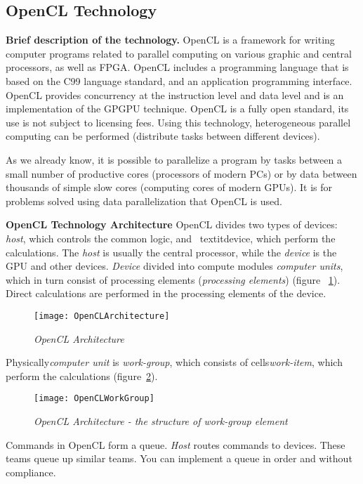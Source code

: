{ %
	\subsection{OpenCL Technology}
	\label{OpenCL:section}
	\par\textbf{Brief description of the technology.} OpenCL is a framework for writing computer programs related to parallel computing on various graphic and central processors, as well as FPGA. OpenCL includes a programming language that is based on the C99 language standard, and an application programming interface. OpenCL provides concurrency at the instruction level and data level and is an implementation of the GPGPU technique. OpenCL is a fully open standard, its use is not subject to licensing fees. Using this technology, heterogeneous parallel computing can be performed (distribute tasks between different devices).
	\par As we already know, it is possible to parallelize a program by tasks between a small number of productive cores (processors of modern PCs) or by data between thousands of simple slow cores (computing cores of modern GPUs). It is for problems solved using data parallelization that OpenCL is used.
	\par\textbf{OpenCL Technology Architecture} OpenCL divides two types of devices: \textit{host}, which controls the common logic, and \ textit{device}, which perform the calculations. The \textit{host} is usually the central processor, while the \textit{device} is the GPU and other devices. \textit{Device} divided into compute modules \textit{computer units}, which in turn consist of processing elements (\textit{processing elements}) (figure ~\ref{OpenCLArchitecture:image}). Direct calculations are performed in the processing elements of the device.
	\begin{figure}[H]
		\texttt{[image: OpenCLArchitecture]}
		\caption{\textit{OpenCL Architecture}}
		\label{OpenCLArchitecture:image}
	\end{figure}
	\par Physically\textit{computer unit} is \textit{work-group}, which consists of cells\textit{work-item}, which perform the calculations (figure~\ref{OpenCLWorkGroup:image}).
	\begin{figure}[H]
		\texttt{[image: OpenCLWorkGroup]}
		\caption{\textit{OpenCL  Architecture - the structure of work-group element}}
		\label{OpenCLWorkGroup:image}
	\end{figure}
	\par Commands in OpenCL form a queue. \textit {Host} routes commands to devices. These teams queue up similar teams. You can implement a queue in order and without compliance.
}
